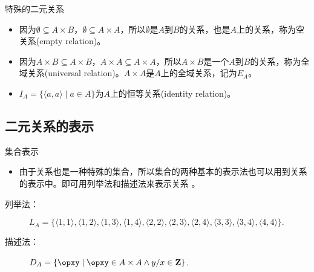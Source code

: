 \begin{frame}{特殊的二元关系}
\pause
\begin{rem}
\begin{itemize}
  \item 因为$\emptyset\subseteq A\times B$，$\emptyset\subseteq A\times A$，所以$\emptyset$是$A$到$B$的关系，也是$A$上的关系，称为\alert{空关系(empty relation)}。\\[8pt]\pause

  \item 因为$A\times B\subseteq A\times B$，$A\times A\subseteq A\times A$，所以$A\times B$是一个$A$到$B$的关系，称为\alert{全域关系(universal relation)}。$A\times A$是$A$上的全域关系，记为$E_A$。\\[8pt]\pause

  \item $I_A=\{\langle a,a\rangle\mid a\in A\}$为$A$上的\alert{恒等关系(identity relation)}。
\end{itemize}
\end{rem}

\end{frame}

\subsection{二元关系的表示}
\begin{frame}{集合表示}
\pause
\begin{itemize}
  \item 由于关系也是一种特殊的集合，所以集合的两种基本的表示法也可以用到关系的表示中。即可用列举法和描述法来表示关系 。
\end{itemize}\pause
\vspace{2ex}
\begin{description}
  \item[列举法：] $L_{A} =\{\langle 1,1\rangle,\langle 1,2\rangle,\langle 1,3\rangle,\langle 1,4\rangle,\langle 2,2\rangle,\langle 2,3\rangle,\langle 2,4\rangle,\langle 3,3\rangle,\langle 3,4\rangle,\langle 4,4\rangle\}.$ \\[6pt]\pause
  \item[描述法：] $D_A=\{\opxy\mid \opxy\in A\times A\land y/x\in\mathbf{Z}\}$.
\end{description}

\end{frame}


